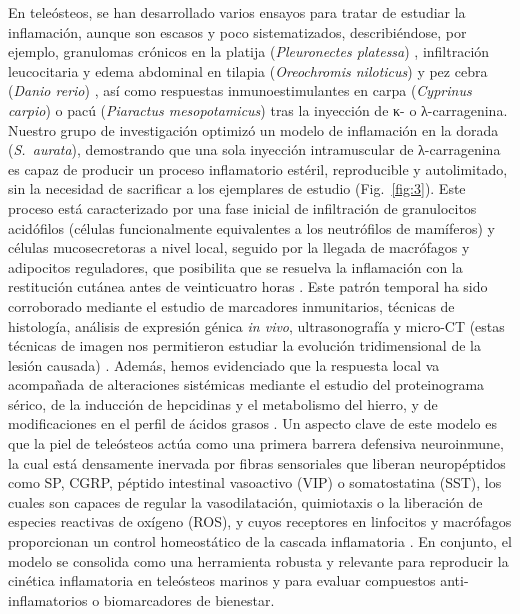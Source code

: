 \documentclass[10pt,a4paper]{article}
\begin{document}
En teleósteos, se han desarrollado varios ensayos para tratar de estudiar la inflamación, aunque son escasos y poco sistematizados, describiéndose, por ejemplo, granulomas crónicos en la platija (\textit{Pleuronectes platessa}) \parencite{Timur1977}, infiltración leucocitaria y edema abdominal en tilapia (\textit{Oreochromis niloticus}) \parencite{Matushima1996} y pez cebra (\textit{Danio rerio}) \parencite{Huang2014}, así como respuestas inmunoestimulantes en carpa (\textit{Cyprinus carpio}) \parencite{Fujiki1997} o pacú (\textit{Piaractus mesopotamicus}) \parencite{Martins2006} tras la inyección de κ- o λ-carragenina. Nuestro grupo de investigación optimizó un modelo de inflamación en la dorada (\textit{S.\ aurata}), demostrando que una sola inyección intramuscular de λ-carragenina es capaz de producir un proceso inflamatorio estéril, reproducible y autolimitado, sin la necesidad de sacrificar a los ejemplares de estudio \parencite{CamposSanchez2021a,CamposSanchez2021b} (Fig.~\ref{fig:3}). Este proceso está caracterizado por una fase inicial de infiltración de granulocitos acidófilos (células funcionalmente equivalentes a los neutrófilos de mamíferos) y células mucosecretoras a nivel local, seguido por la llegada de macrófagos y adipocitos reguladores, que posibilita que se resuelva la inflamación con la restitución cutánea antes de veinticuatro horas \parencite{CamposSanchez2021c,CamposSanchez2022}. Este patrón temporal ha sido corroborado mediante el estudio de marcadores inmunitarios, técnicas de histología, análisis de expresión génica \textit{in vivo}, ultrasonografía y micro-CT (estas técnicas de imagen nos permitieron estudiar la evolución tridimensional de la lesión causada) \parencite{CamposSanchez2022b}. Además, hemos evidenciado que la respuesta local va acompañada de alteraciones sistémicas mediante el estudio del proteinograma sérico, de la inducción de hepcidinas y el metabolismo del hierro, y de modificaciones en el perfil de ácidos grasos \parencite{CamposSanchez2025,CamposSanchez2021d,CamposSanchez2024,CamposSanchez2024b}. Un aspecto clave de este modelo es que la piel de teleósteos actúa como una primera barrera defensiva neuroinmune, la cual está densamente inervada por fibras sensoriales que liberan neuropéptidos como SP, CGRP, péptido intestinal vasoactivo (VIP) o somatostatina (SST), los cuales son capaces de regular la vasodilatación, quimiotaxis o la liberación de especies reactivas de oxígeno (ROS), y cuyos receptores en linfocitos y macrófagos proporcionan un control homeostático de la cascada inflamatoria \parencite{Scholzen1998}. En conjunto, el modelo se consolida como una herramienta robusta y relevante para reproducir la cinética inflamatoria en teleósteos marinos y para evaluar compuestos anti-inflamatorios o biomarcadores de bienestar.
\end{document}
